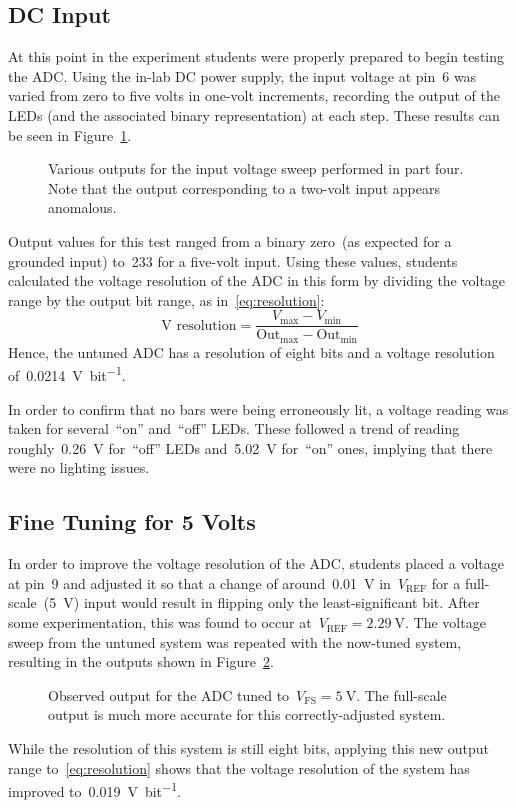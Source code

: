 \subsection{DC Input}
At this point in the experiment students were properly prepared to begin testing the ADC.  Using the in-lab DC power supply, the input voltage at pin~6 was varied from zero to five volts in one-volt increments, recording the output of the LEDs (and the associated binary representation) at each step.  These results can be seen in Figure~\ref{fig:pt4bars}.
%
\begin{figure}[H]
	\centering
	
	\parbox{.6\textwidth}{
	\caption[LED output for untuned ADC]{Various outputs for the input voltage sweep performed in part four.  Note that the output corresponding to a two-volt input appears anomalous.}
	\label{fig:pt4bars}}
\end{figure}
%
Output values for this test ranged from a binary zero~(as expected for a grounded input) to~233 for a five-volt input.  Using these values, students calculated the voltage resolution of the ADC in this form by dividing the voltage range by the output bit range, as in~\eqref{eq:resolution}:
%
\begin{equation}
	\text{V resolution} = \frac{V_\text{max} - V_\text{min}}{\text{Out}_\text{max} - \text{Out}_\text{min}}
	\label{eq:resolution}
\end{equation}
%
Hence, the untuned ADC has a resolution of eight bits and a voltage resolution of~\SI{0.0214}{\volt\per bit}.

In order to confirm that no bars were being erroneously lit, a voltage reading was taken for several~``on'' and~``off'' LEDs.  These followed a trend of reading roughly~\SI{0.26}{\volt} for~``off'' LEDs and~\SI{5.02}{\volt} for~``on'' ones, implying that there were no lighting issues.

\subsection{Fine Tuning for 5 Volts}
In order to improve the voltage resolution of the ADC, students placed a voltage at pin~9 and adjusted it so that a change of around~\SI{0.01}{\volt} in~$V_\text{REF}$ for a full-scale~(\SI{5}{\volt}) input would result in flipping only the least-significant bit.  After some experimentation, this was found to occur at~$V_\text{REF} = \SI{2.29}{\volt}$.  The voltage sweep from the untuned system was repeated with the now-tuned system, resulting in the outputs shown in Figure~\ref{fig:pt5bars}.
%
\begin{figure}[H]
	\centering
	
	\parbox{.6\textwidth}{
	\caption[LED output for tuned ADC; $V_\text{FS} = \SI{5}{\volt}$]{Observed output for the ADC tuned to~$V_\text{FS} = \SI{5}{\volt}$.  The full-scale output is much more accurate for this correctly-adjusted system.}
	\label{fig:pt5bars}}
\end{figure}
%
While the resolution of this system is still eight bits, applying this new output range to~\eqref{eq:resolution} shows that the voltage resolution of the system has improved to~\SI{0.019}{\volt\per bit}.

